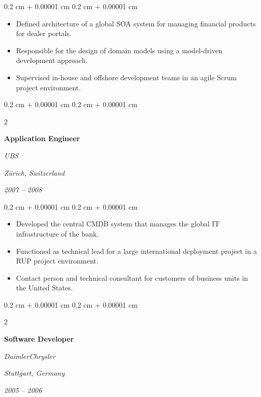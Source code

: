 \documentclass[10pt, a4paper]{article}
\newenvironment{highlights}{
    \begin{itemize}[
        topsep=0.10 cm,
        parsep=0.10 cm,
        partopsep=0pt,
        itemsep=0pt,
        leftmargin=0.4 cm + 10pt
    ]
}{
    \end{itemize}
} %
\newenvironment{onecolentry}{
    \begin{adjustwidth}{
        0.2 cm + 0.00001 cm
    }{
        0.2 cm + 0.00001 cm
    }
}{
    \end{adjustwidth}
} %
\newenvironment{twocolentry}[2][6cm]{ %
    \onecolentry
    \def\secondColumn{#2}
    \setcolumnwidth{\fill, #1} %
    \begin{paracol}{2}
}{
    \switchcolumn \raggedleft \secondColumn
    \end{paracol}
    \endonecolentry
} %
\begin{document}
\vspace{0.10 cm}
\begin{onecolentry}
    \begin{highlights}
        \item Defined architecture of a global SOA system for managing financial products for dealer portals.
        \item Responsible for the design of domain models using a model-driven development approach.
        \item Supervised in-house and offshore development teams in an agile Scrum project environment.
    \end{highlights}
\end{onecolentry}

\vspace{0.20 cm}



%
%
\begin{twocolentry}{
        \textit{Zürich, Switzerland}

        \textit{2007 – 2008}}
    \textbf{Application Engineer}

    \textit{UBS}
\end{twocolentry}

\vspace{0.10 cm}
\begin{onecolentry}
    \begin{highlights}
        \item Developed the central CMDB system that manages the global IT infrastructure of the bank.
        \item Functioned as technical lead for a large international deployment project in a RUP project environment.
        \item Contact person and technical consultant for customers of business units in the United States.
    \end{highlights}
\end{onecolentry}

\vspace{0.20 cm}



%
%
\begin{twocolentry}{
        \textit{Stuttgart, Germany}

        \textit{2005 – 2006}}
    \textbf{Software Developer}

    \textit{DaimlerChrysler}
\end{twocolentry}
\end{document}
